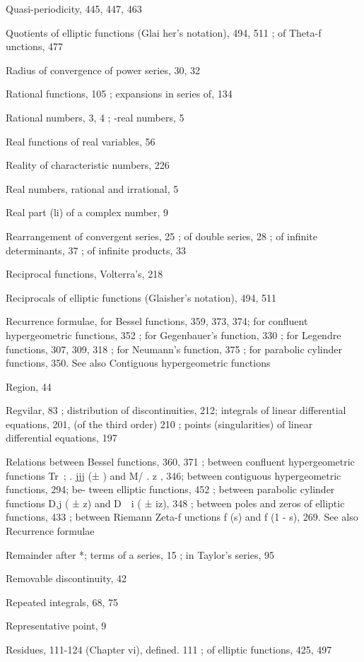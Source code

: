 Quasi-periodicity, 445, 447, 463

Quotients of elliptic functions (Glai her's notation), 494, 511 ; of Theta-f unctions, 477

Radius of convergence of power series, 30, 32

Rational functions, 105 ; expansions in series of, 134

Rational numbers, 3, 4 ; -real numbers, 5

Real functions of real variables, 56

Reality of characteristic numbers, 226

Real numbers, rational and irrational, 5

Real part (li) of a complex number, 9

Rearrangement of convergent series, 25 ; of double series, 28 ; of infinite determinants, 37 ; of
infinite products, 33

Reciprocal functions, Volterra's, 218

Reciprocals of elliptic functions (Glaisher's notation), 494, 511

Recurrence formulae, for Bessel functions, 359, 373, 374; for confluent hypergeometric functions,
352 ; for Gegenbauer's function, 330 ; for Legendre functions, 307, 309, 318 ; for Neumann's
function, 375 ; for parabolic cylinder functions, 350. See also Contiguous hypergeometric
functions

Region, 44

Regvilar, 83 ; distribution of discontinuities, 212; integrals of linear differential equations, 201,
(of the third order) 210 ; points (singularities) of linear differential equations, 197

Relations between Bessel functions, 360, 371 ; between confluent hypergeometric functions
Tr\ ; . jjj (± ) and M/ .    z , 346; between contiguous hypergeometric functions, 294; be-
tween elliptic functions, 452 ; between parabolic cylinder functions D,j ( ± z) and D\  \ i ( ± iz),
348 ; between poles and zeros of elliptic functions, 433 ; between Riemann Zeta-f unctions
f (s) and f (1 - s), 269. See also Recurrence formulae

Remainder after *; terms of a series, 15 ; in Taylor's series, 95

Removable discontinuity, 42

Repeated integrals, 68, 75

Representative point, 9

Residues, 111-124 (Chapter vi), defined. 111 ; of elliptic functions,
425, 497

